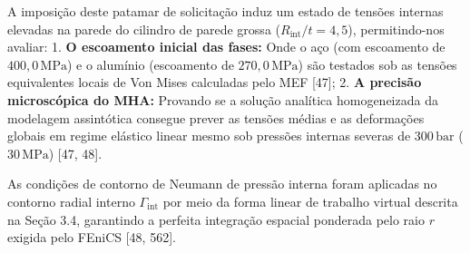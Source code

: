 A imposição deste patamar de solicitação induz um estado de tensões internas elevadas na parede do cilindro de parede grossa ($R_{\text{int}}/t = 4,5$), permitindo-nos avaliar:
1. \textbf{O escoamento inicial das fases:} Onde o aço (com escoamento de $400,0 \, \text{MPa}$) e o alumínio (escoamento de $270,0 \, \text{MPa}$) são testados sob as tensões equivalentes locais de Von Mises calculadas pelo MEF [47];
2. \textbf{A precisão microscópica do MHA:} Provando se a solução analítica homogeneizada da modelagem assintótica consegue prever as tensões médias e as deformações globais em regime elástico linear mesmo sob pressões internas severas de $300 \, \text{bar}$ ($30 \, \text{MPa}$) [47, 48].

As condições de contorno de Neumann de pressão interna foram aplicadas no contorno radial interno $\Gamma_{\text{int}}$ por meio da forma linear de trabalho virtual descrita na Seção 3.4, garantindo a perfeita integração espacial ponderada pelo raio $r$ exigida pelo FEniCS [48, 562].